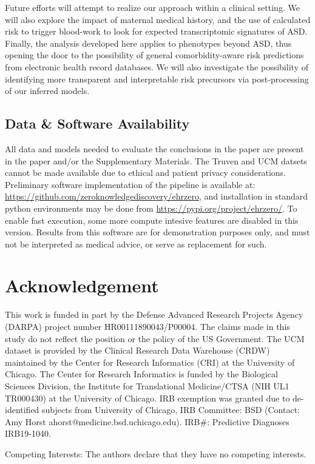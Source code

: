 \documentclass[onecolumn,10pt]{IEEEtran}
\begin{document}
Future efforts will attempt to realize our approach within a clinical setting. We will also explore the impact of  maternal medical history, and the  use of calculated risk to trigger   blood-work to look for expected  transcriptomic  signatures of ASD. Finally,  the analysis developed here applies to phenotypes beyond ASD, thus opening the door to the possibility of  general  comorbidity-aware risk predictions  from electronic health record databases. {\HCOL We will also investigate the possibility of identifying more transparent and interpretable risk precursors via post-processing of our inferred models.}


\subsection*{Data \& Software Availability} 
All data and models needed to evaluate the conclusions in the paper are present in the paper and/or the Supplementary Materials. The Truven and UCM datsets  cannot be made available due to ethical and patient privacy considerations. Preliminary software implementation of the pipeline is available at: 
\url{https://github.com/zeroknowledgediscovery/ehrzero}, and installation in standard python environments may be done from \url{https://pypi.org/project/ehrzero/}. To enable fast execution, some more compute intesive features are disabled in this version. Results from this software are for demonstration purposes only, and must not be interpreted as medical advice, or serve as replacement for such.


\section*{Acknowledgement}
This work is funded in part by the Defense Advanced Research Projects Agency (DARPA) project number  HR00111890043/P00004. The claims made in this study  do not  reflect the position or the policy of the US Government. The UCM dataset is provided by the Clinical Research Data Warehouse (CRDW) maintained by the Center for Research Informatics (CRI) at the  University of Chicago. The Center for Research Informatics is funded by the Biological Sciences Division, the Institute for Translational Medicine/CTSA (NIH UL1 TR000430) at the University of Chicago. IRB exemption was granted due to de-identified subjects from University of Chicago, IRB Committee: BSD (Contact: Amy Horst
ahorst@medicine.bsd.uchicago.edu). IRB\#: Predictive Diagnoses IRB19-1040.

Competing Interests: The authors declare that they have no competing interests.
\end{document}
